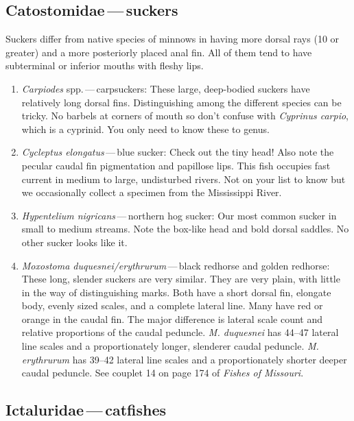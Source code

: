 \documentclass[11pt, hidelinks]{exam}
\begin{document}
\subsection*{Catostomidae\,—\,suckers}

Suckers differ from native species of minnows in having more dorsal rays (10 or greater) and a more posteriorly placed anal fin.  All of them tend to have subterminal or inferior mouths with fleshy lips.

\begin{enumerate}
\item \textit{Carpiodes} spp.\,—\,carpsuckers:  These large, deep-bodied suckers have relatively long dorsal fins.  Distinguishing among the different species can be tricky.  No barbels at corners of mouth so don’t confuse with \textit{Cyprinus carpio}, which is a cyprinid.  You only need to know these to genus.

\item \textit{Cycleptus elongatus}\,—\,blue sucker: Check out the tiny head!  Also note the pecular caudal fin pigmentation and papillose lips.  This fish occupies fast current in medium to large, undisturbed rivers.  Not on your list to know but we occasionally collect a specimen from the Mississippi River.

\item \textit{Hypentelium nigricans}\,—\,northern hog sucker:  Our most common sucker in small to medium streams.  Note the box-like head and bold dorsal saddles.  No other sucker looks like it.

\item \textit{Moxostoma duquesnei/erythrurum}\,—\,black redhorse and golden redhorse:  These long, slender suckers are very similar.  They are very plain, with little in the way of distinguishing marks.  Both have a short dorsal fin, elongate body, evenly sized scales, and a complete lateral line.  Many have red or orange in the caudal fin.  The major difference is lateral scale count and relative proportions of the caudal peduncle. \textit{M. duquesnei} has 44--47 lateral line scales and a proportionately longer, slenderer caudal peduncle. \textit{M. erythrurum} has 39--42 lateral line scales and a proportionately shorter deeper caudal peduncle. See couplet 14 on page 174 of \textit{Fishes of Missouri}.
\end{enumerate}


\subsection*{Ictaluridae\,—\,catfishes}
\end{document}
